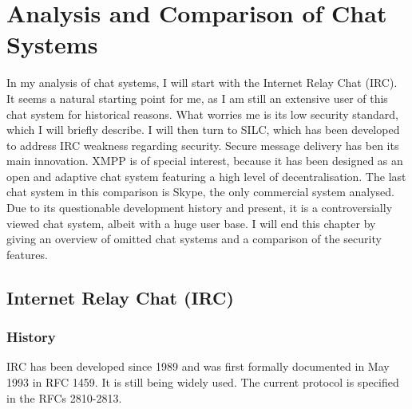 \chapter{Analysis and Comparison of Chat Systems}
\label{chatsystems}
In my analysis of chat systems, I will start with
the Internet Relay Chat (IRC). It seems a natural starting point for me,
as I am still an extensive user of this chat system for historical reasons.
What worries me is its low security standard, which I will briefly describe.
I will then turn to SILC, which has been developed to address IRC weakness
regarding security. Secure message delivery has ben its main
innovation. XMPP is of special interest, because it has been designed as an
open and adaptive chat system featuring a high level of decentralisation.
The last chat system in this comparison is Skype, the only commercial
system analysed. Due to its questionable development history and present, it is
a controversially viewed chat system, albeit with a huge user base.
I will end this chapter by giving an overview of omitted chat systems
and a comparison of the security features.
\section{Internet Relay Chat (IRC)}
\subsection{History}
IRC has been developed since 1989 and was first formally documented in May 1993 in 
RFC 1459\cite{rfc1459}. It is still being widely used.\cite{ircusage}
The current protocol is specified in the RFCs 2810-2813\cite{rfc2810,rfc2811,rfc2812,rfc2813}.
